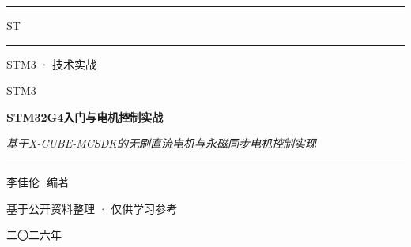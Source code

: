 
\begin{titlepage}
\thispagestyle{empty}
\pagecolor{qianhui!30}

\vspace*{28mm}
\noindent
\hfill\textcolor{zhusha}{\rule{40mm}{1pt}}\hspace{4mm}\textsf{ST}\hspace{4mm}\textcolor{zhusha}{\rule{40mm}{1pt}}

\vspace{4mm}
\begin{center}
{\small\color{shenhui}STM3 · 技术实战}
\end{center}

\vspace{48mm}

\begin{center}
{\color{zhusha}\Huge\heiti STM3}

\vspace{10mm}

{\Huge\bfseries STM32G4入门与电机控制实战}

\vspace{6mm}

{\LARGE\bfseries }

\vspace{10mm}

{\large\itshape\color{shenhui} 基于X-CUBE-MCSDK的无刷直流电机与永磁同步电机控制实现}
\end{center}

\vfill

\vspace{30mm}
\begin{center}
\textcolor{zhusha}{\rule{60mm}{0.4pt}}

\vspace{6mm}
{\Large 李佳伦\,\, 编著}

\vspace{4mm}
{\small\color{shenhui} 基于公开资料整理 · 仅供学习参考}

\vspace{14mm}
{\large 二〇二六年}
\end{center}

\vspace{14mm}

\clearpage
\nopagecolor
\end{titlepage}
